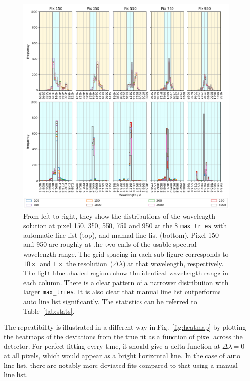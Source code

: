\documentclass{aa}
\begin{document}
\begin{figure}[h]
    \centering
    \includegraphics[width=\textwidth]{plots/figure_4_wavelengths.png}
    \caption{From left to right, they show the distributions of the wavelength
    solution at pixel 150, 350, 550, 750 and 950 at the 8 \texttt{max\_tries} with
    automatic line list (top), and manual line list (bottom). Pixel 150 and 950 are
    roughly at the two ends of the usable spectral wavelength range. The
    grid spacing in each sub-figure corresponds to $10\times$ and $1\times$ the
    resolution~($\Delta\lambda$) at that wavelength, respectively. The light blue
    shaded regions show the identical wavelength range in each column. There is a
    clear pattern of a narrower distribution with larger \texttt{max\_tries}. It
    is also clear that manual line list outperforms auto line list significantly.
    The statistics can be referred to Table~\ref{tab:stats}.}
    \label{fig:wavelengths}
\end{figure}

The repeatibility is illustrated in a different way in Fig.~\ref{fig:heatmap} by
plotting the heatmaps of the deviations from the true fit as a function of pixel
across the detector. For perfect fitting every time, it should give a delta function
at $\Delta \lambda = 0$ at all pixels, which would appear as a bright horizontal line.
In the case of auto line list, there are notably more deviated fits compared to
that using a manual line list. 
\end{document}
